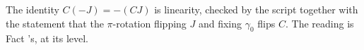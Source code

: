 The identity $C(-J) = -(CJ)$ is linearity, checked by the script together with the statement that the $\pi$-rotation flipping $J$ and fixing $\gamma_{0}$ flips $C$. The reading is Fact 's, at its level.
